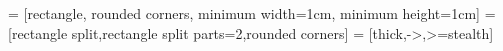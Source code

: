 %

\usetikzlibrary{calc,shapes, arrows,positioning}
 = [rectangle, rounded corners, minimum width=1cm, minimum height=1cm]
=[rectangle split,rectangle split parts=2,rounded corners]
 = [thick,->,>=stealth]

\newcommand{\Mm}{\sct{MM}}
\newcommand{\Migraine}{\sct{Migraine}}
\newcommand{\mtg}{\sct{m2g}}

\newcommand{\website}{\url{https://github.com/neurodata/MGC/}}
\newcommand{\jhu}{Johns Hopkins University}
\newcommand{\email}{jovo@jhu.edu}

